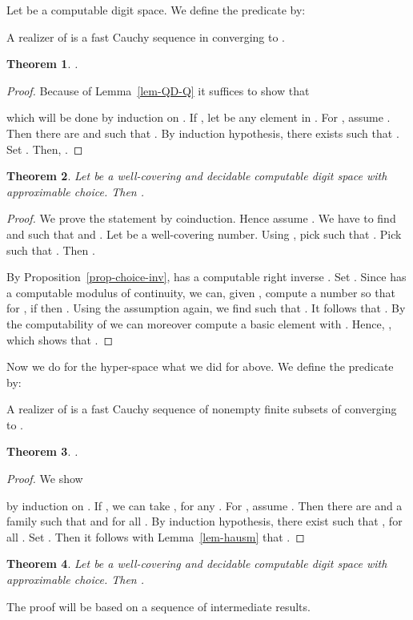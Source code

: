 \documentclass[microtype]{jloganal}
\theoremstyle{plain}
\newtheorem{theorem}{Theorem}[section]
\theoremstyle{definition}
\begin{document}
Let  be a computable digit space.
We define the predicate  by:

A realizer of  is a fast Cauchy sequence in  converging to .

\begin{theorem}
\label{thm-c-sub-a}
.
\end{theorem}
\begin{proof}
Because of Lemma~\ref{lem-QD-Q} it suffices to show that

which will be done by induction on .
If , let  be any element in .
For , assume . Then there are 
 and  such that . By induction hypothesis,
there exists  such that . 
Set . Then, . 
\end{proof}
  

\begin{theorem}
\label{thm-a-sub-c}
Let  be a well-covering and decidable computable digit space with approximable choice.
Then .
\end{theorem}
\begin{proof}
We prove the statement by coinduction. Hence assume .
We have to find  and  such that  and .
Let  be a well-covering number.
Using ,  
pick  such that .
Pick  such that . 
Then . 

By Proposition~\ref{prop-choice-inv},  has a computable right inverse . 
Set . Since  has a computable modulus of continuity, we can, 
given , compute a number  so that for , 
if  then . 
Using the assumption  again, we find  such that
.
It follows that . By the computability 
of  we can moreover compute a basic element  with 
. 
Hence, , which shows that .
\end{proof}

Now we do for the hyper-space  what we did for  above.
We define the predicate  by:

A realizer of  is a fast Cauchy sequence of nonempty 
finite subsets of  converging to .

\begin{theorem}
\label{thm-ck-sub-ak}
.
\end{theorem}
\begin{proof}
We show 

by induction on .
If , we can take , for any .
For , assume . Then there are 
 and a family 
such that  and  for
all .
By induction hypothesis,
there exist  such that ,
for all . Set . 
Then it follows with Lemma~\ref{lem-hausm} that . 
\end{proof}


\begin{theorem}
\label{thm-ak-sub-ck}
Let  be a well-covering and decidable computable digit space with approximable choice. Then .
\end{theorem}
The proof will be based on a sequence of intermediate results.
\end{document}
